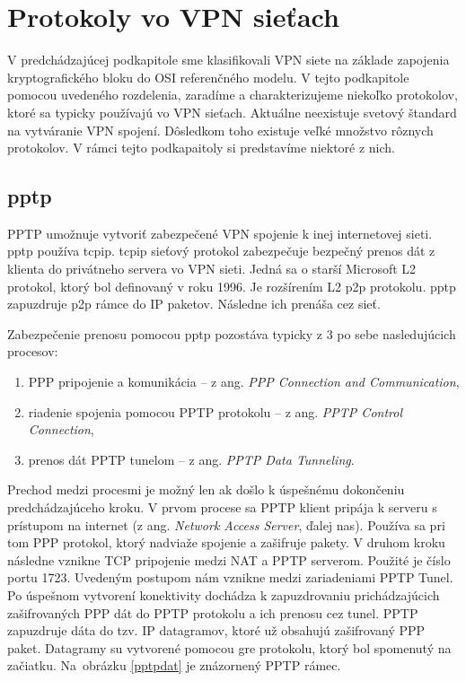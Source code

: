 \section{Protokoly vo VPN sieťach} 
V predchádzajúcej podkapitole sme klasifikovali VPN siete na základe zapojenia kryptografického bloku do OSI referenčného modelu. V tejto podkapitole pomocou uvedeného rozdelenia, zaradíme a charakterizujeme niekoľko protokolov, ktoré sa typicky používajú vo VPN sieťach. Aktuálne neexistuje svetový štandard na vytváranie VPN spojení. Dôsledkom toho existuje veľké množstvo rôznych protokolov. V rámci tejto podkapaitoly si predstavíme niektoré z nich. 

\subsection{\acrfull{pptp}}
PPTP umožnuje vytvoriť zabezpečené VPN spojenie k inej internetovej sieti. \acrshort{pptp} používa \acrshort{tcpip}. \acrshort{tcpip} sieťový protokol zabezpečuje bezpečný prenos dát z klienta do privátneho servera vo VPN sieti. Jedná sa o starší Microsoft L2 protokol, ktorý bol definovaný v roku 1996. Je rozšírením L2 \acrshort{p2p} protokolu. \acrshort{pptp} zapuzdruje \acrshort{p2p} rámce do  IP paketov. Následne ich prenáša cez sieť. 

Zabezpečenie prenosu pomocou \acrshort{pptp} pozostáva typicky z 3 po sebe nasledujúcich procesov:
\begin{enumerate}
	\item{PPP pripojenie a komunikácia } -- z ang. \textit{PPP Connection and Communication},
	\item{riadenie spojenia pomocou PPTP protokolu} -- z ang. \textit{PPTP Control Connection},
	\item{prenos dát PPTP tunelom} -- z ang. \textit{PPTP Data Tunneling}.
\end{enumerate}
Prechod medzi procesmi je možný len ak došlo k úspešnému dokončeniu predchádzajúceho kroku. V prvom procese sa PPTP klient pripája k serveru s prístupom na internet (z ang. \textit{Network Access Server}, ďalej \acrshort{nas}). Používa sa pri tom PPP protokol, ktorý nadviaže spojenie a zašifruje pakety. V druhom kroku následne vznikne TCP pripojenie medzi NAT a PPTP serverom. Použité je číslo portu 1723. Uvedeným postupom nám vznikne medzi zariadeniami PPTP Tunel. Po úspešnom vytvorení konektivity dochádza k zapuzdrovaniu prichádzajúcich zašifrovaných PPP dát do PPTP protokolu a ich prenosu cez tunel. PPTP zapuzdruje dáta do tzv. IP datagramov, ktoré už obsahujú zašifrovaný PPP paket. Datagramy su vytvorené pomocou \acrshort{gre} protokolu, ktorý bol spomenutý na začiatku. Na~obrázku \ref{pptpdat} je znázornený PPTP rámec. 

